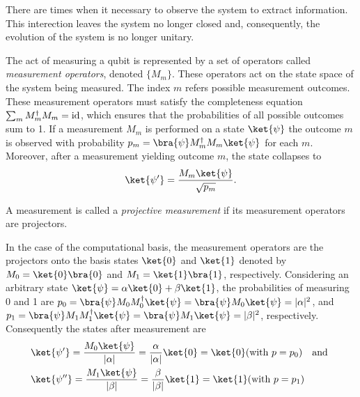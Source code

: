 
There are times when it necessary to observe the system to extract information. This interection leaves the system no longer closed and, consequently, the evolution of the system is no longer unitary. 

\begin{definition}
The act of measuring a qubit is represented by a set of operators called \emph{measurement operators}, denoted $\{M_{m}\}$. These operators act on the state space  of the system being measured. The index $m$ refers possible measurement outcomes. These measurement operators must satisfy the completeness equation $\sum_{m} M_{m}^{\dagger}M_{m} = \mathrm{id}$, which ensures that the probabilities of all possible outcomes sum to 1. If a measurement ${M_m}$ is performed on a state $\ket{\psi}$ the outcome $m$ is observed with probability $p_m = \bra{\psi}M_{m}^{\dagger}M_{m}\ket{\psi}$ for each $m$. Moreover, after a measurement yielding outcome $m$, the state collapses to 
\begin{align*}
  \ket{\psi'}=\frac{M_{m}\ket{\psi}}{\sqrt{p_{m}}}.
\end{align*}
\end{definition}

\begin{definition}
  A measurement is called a \emph{projective measurement} if its measurement operators are projectors.
\end{definition}

\begin{example}
In the case of the computational basis, the measurement operators are the projectors onto the basis states $\ket{0}$ and $\ket{1}$ denoted by $M_{0} = \ket{0}\bra{0}$ and $M_{1} = \ket{1}\bra{1}$, respectively. Considering an arbitrary state $\ket{\psi} = \alpha \ket{0} + \beta \ket{1}$, the probabilities of measuring 0 and 1 are $p_0 = \bra{\psi} M_{0} M_{0}^{\dag}\ket{\psi}=\bra{\psi} M_{0} \ket{\psi} = |\alpha|^{2}$, and $p_1 = \bra{\psi} M_{1} M_{1}^{\dag}\ket{\psi} = \bra{\psi} M_{1} \ket{\psi} =  |\beta|^{2} $, respectively. Consequently the states after measurement are
\begin{align*}
  &\ket{\psi'}=\frac{M_{0}\ket{\psi}} {|\alpha|} = \frac{\alpha}{|\alpha|} \ket{0} = \ket{0} (\text{with  } p=p_0) \quad \text{and } \\
  &\ket{\psi''}= \frac{M_{1}\ket{\psi}} {|\beta|} = \frac{\beta}{|\beta|} \ket{1} = \ket{1} (\text{with  } p=p_1)
\end{align*}
\end{example}


